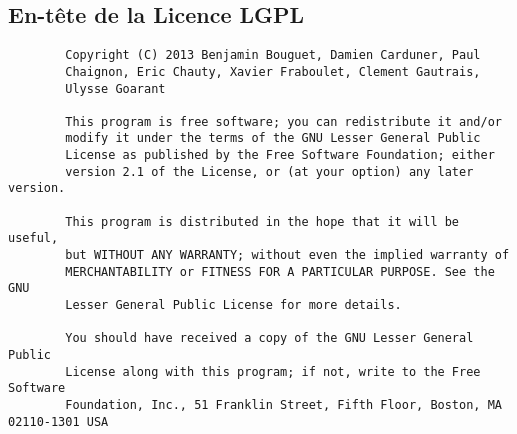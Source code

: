 \begin{appendices}

	\chapter{En-tête de la Licence LGPL}
	\label{licence}

	\begin{lstlisting}
		Copyright (C) 2013 Benjamin Bouguet, Damien Carduner, Paul 
		Chaignon, Eric Chauty, Xavier Fraboulet, Clement Gautrais, 
		Ulysse Goarant

		This program is free software; you can redistribute it and/or
		modify it under the terms of the GNU Lesser General Public
		License as published by the Free Software Foundation; either
		version 2.1 of the License, or (at your option) any later version.

		This program is distributed in the hope that it will be useful,
		but WITHOUT ANY WARRANTY; without even the implied warranty of
		MERCHANTABILITY or FITNESS FOR A PARTICULAR PURPOSE. See the GNU
		Lesser General Public License for more details.

		You should have received a copy of the GNU Lesser General Public
		License along with this program; if not, write to the Free Software
		Foundation, Inc., 51 Franklin Street, Fifth Floor, Boston, MA 02110-1301 USA
	\end{lstlisting}

\end{appendices}
